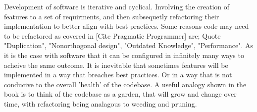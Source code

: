     Development of software is iterative and cyclical. Involving the creation of features to a set of requirments, and then subsequetly refactoring their implementation to better align with best practices. Some reasons code may need to be refactored as covered in [Cite Pragmatic Programmer] are; Quote "Duplication", "Nonorthogonal design", "Outdated Knowledge", "Performance". As it is the case with software that it can be configured in infinitely many ways to acheive the same outcome. It is inevitable that sometimes features will be implemented in a way that breaches best practices. Or in a way that is not conducive to the overall 'health' of the codebase. A useful analogy shown in the book is to think of the codebase as a garden, that will grow and change over time, with refactoring being analagous to weeding and pruning.

